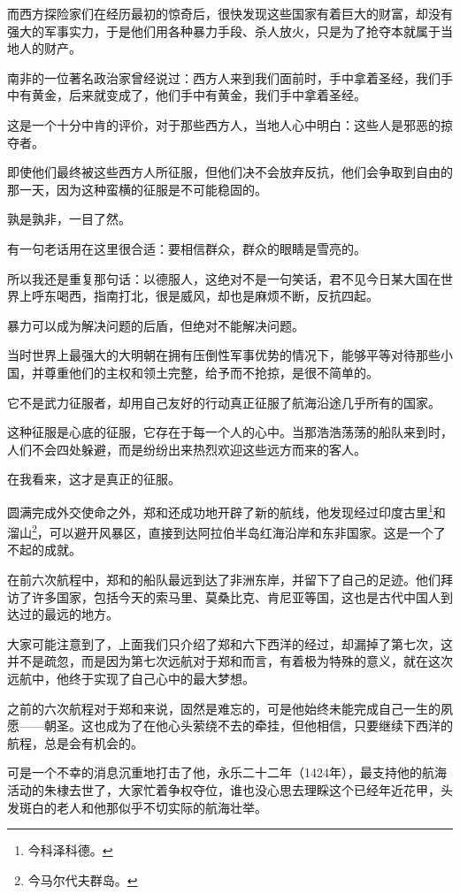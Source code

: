\begin{multicols}{\theparacolNo}
而西方探险家们在经历最初的惊奇后，很快发现这些国家有着巨大的财富，却没有强大的军事实力，于是他们用各种暴力手段、杀人放火，只是为了抢夺本就属于当地人的财产。

南非的一位著名政治家曾经说过：西方人来到我们面前时，手中拿着圣经，我们手中有黄金，后来就变成了，他们手中有黄金，我们手中拿着圣经。

这是一个十分中肯的评价，对于那些西方人，当地人心中明白：这些人是邪恶的掠夺者。

即使他们最终被这些西方人所征服，但他们决不会放弃反抗，他们会争取到自由的那一天，因为这种蛮横的征服是不可能稳固的。

孰是孰非，一目了然。

有一句老话用在这里很合适：要相信群众，群众的眼睛是雪亮的。

所以我还是重复那句话：以德服人，这绝对不是一句笑话，君不见今日某大国在世界上呼东喝西，指南打北，很是威风，却也是麻烦不断，反抗四起。

暴力可以成为解决问题的后盾，但绝对不能解决问题。

当时世界上最强大的大明朝在拥有压倒性军事优势的情况下，能够平等对待那些小国，并尊重他们的主权和领土完整，给予而不抢掠，是很不简单的。

它不是武力征服者，却用自己友好的行动真正征服了航海沿途几乎所有的国家。

这种征服是心底的征服，它存在于每一个人的心中。当那浩浩荡荡的船队来到时，人们不会四处躲避，而是纷纷出来热烈欢迎这些远方而来的客人。

在我看来，这才是真正的征服。

圆满完成外交使命之外，郑和还成功地开辟了新的航线，他发现经过印度古里\footnote{今科泽科德。}和溜山\footnote{今马尔代夫群岛。}，可以避开风暴区，直接到达阿拉伯半岛红海沿岸和东非国家。这是一个了不起的成就。

在前六次航程中，郑和的船队最远到达了非洲东岸，并留下了自己的足迹。他们拜访了许多国家，包括今天的索马里、莫桑比克、肯尼亚等国，这也是古代中国人到达过的最远的地方。

大家可能注意到了，上面我们只介绍了郑和六下西洋的经过，却漏掉了第七次，这并不是疏忽，而是因为第七次远航对于郑和而言，有着极为特殊的意义，就在这次远航中，他终于实现了自己心中的最大梦想。

之前的六次航程对于郑和来说，固然是难忘的，可是他始终未能完成自己一生的夙愿——朝圣。这也成为了在他心头萦绕不去的牵挂，但他相信，只要继续下西洋的航程，总是会有机会的。

可是一个不幸的消息沉重地打击了他，永乐二十二年（1424年），最支持他的航海活动的朱棣去世了，大家忙着争权夺位，谁也没心思去理睬这个已经年近花甲，头发斑白的老人和他那似乎不切实际的航海壮举。


\end{multicols}
